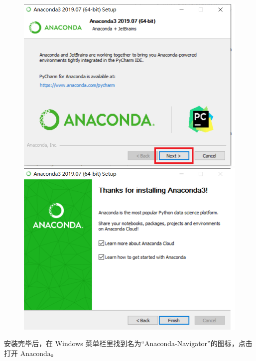 \begin{figure}[!ht]
  \centering
  \includegraphics[scale=0.5]{figure/chapter1/anaconda13.png}\quad
  \includegraphics[scale=0.5]{figure/chapter1/anaconda14.png}
\end{figure}

安装完毕后，在 Windows 菜单栏里找到名为“Anaconda-Navigator”的图标，点击打开 Anaconda。

